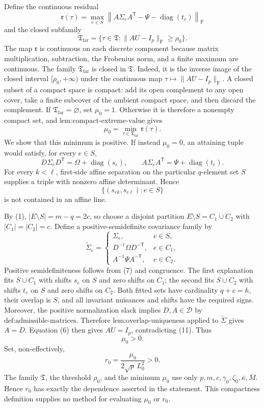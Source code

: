 Define the continuous residual
\[
\mathfrak r(\tau)=
\max_{e\in S}
\left\|A\Sigma_eA^{\mathsf T}
-\Psi-\operatorname{diag}(t_e)\right\|_{\mathrm F}
\tag{10}
\]
and the closed subfamily
\[
\mathfrak T_{\mathrm{far}}
=\{\tau\in\mathfrak T:\|AU-I_p\|_{\mathrm F}\geq\rho_0\}.
\tag{11}
\]
The map \(\mathfrak r\) is continuous on each discrete component because matrix multiplication, subtraction, the Frobenius norm, and a finite maximum are continuous. The family \(\mathfrak T_{\mathrm{far}}\) is closed in \(\mathfrak T\). Indeed, it is the inverse image of the closed interval \([\rho_0,+\infty)\) under the continuous map \(\tau\mapsto\|AU-I_p\|_{\mathrm F}\). A closed subset of a compact space is compact: add its open complement to any open cover, take a finite subcover of the ambient compact space, and then discard the complement. If \(\mathfrak T_{\mathrm{far}}=\varnothing\), set \(\mu_0=1\). Otherwise it is therefore a nonempty compact set, and \(\text{lem:compact-extreme-value}\) gives
\[
\mu_0=\min_{\tau\in\mathfrak T_{\mathrm{far}}}\mathfrak r(\tau).
\tag{12}
\]
We show that this minimum is positive. If instead \(\mu_0=0\), an attaining tuple would satisfy, for every \(e\in S\),
\[
D\Sigma_eD^{\mathsf T}=\Omega+\operatorname{diag}(s_e),
\qquad
A\Sigma_eA^{\mathsf T}=\Psi+\operatorname{diag}(t_e).
\tag{13}
\]
For every \(k<\ell\), first-side affine separation on the particular \(q\)-element set \(S\) supplies a triple with nonzero affine determinant. Hence
\[
\{(s_{ek},s_{e\ell}):e\in S\}
\]
is not contained in an affine line.

By (1), \(|E\setminus S|=m-q=2c\), so choose a disjoint partition \(E\setminus S=C_1\mathbin{\dot\cup}C_2\) with \(|C_1|=|C_2|=c\). Define a positive-semidefinite covariance family by
\[
\widetilde\Sigma_e=
\begin{cases}
\Sigma_e,&e\in S,\\
D^{-1}\Omega D^{-\mathsf T},&e\in C_1,\\
A^{-1}\Psi A^{-\mathsf T},&e\in C_2.
\end{cases}
\tag{14}
\]
Positive semidefiniteness follows from (7) and congruence. The first explanation fits \(S\cup C_1\) with shifts \(s_e\) on \(S\) and zero shifts on \(C_1\); the second fits \(S\cup C_2\) with shifts \(t_e\) on \(S\) and zero shifts on \(C_2\). Both fitted sets have cardinality \(q+c=h\), their overlap is \(S\), and all invariant nuisances and shifts have the required signs. Moreover, the positive normalization slack implies \(D,A\in\mathcal D\) by \(\text{def:admissible-matrices}\). Therefore \(\text{lem:overlap-uniqueness}\) applied to \(\widetilde\Sigma\) gives \(A=D\). Equation (6) then gives \(AU=I_p\), contradicting (11). Thus
\[
\mu_0>0.
\tag{15}
\]
Set, non-effectively,
\[
r_0=\frac{\mu_0}{2\sqrt p\,L_0^2}>0.
\tag{16}
\]
The family \(\mathfrak T\), the threshold \(\rho_0\), and the minimum \(\mu_0\) use only \(p,m,c,\gamma_0,\zeta_0,\overline\kappa,\overline M\). Hence \(r_0\) has exactly the dependence asserted in the statement. This compactness definition supplies no method for evaluating \(\mu_0\) or \(r_0\).

